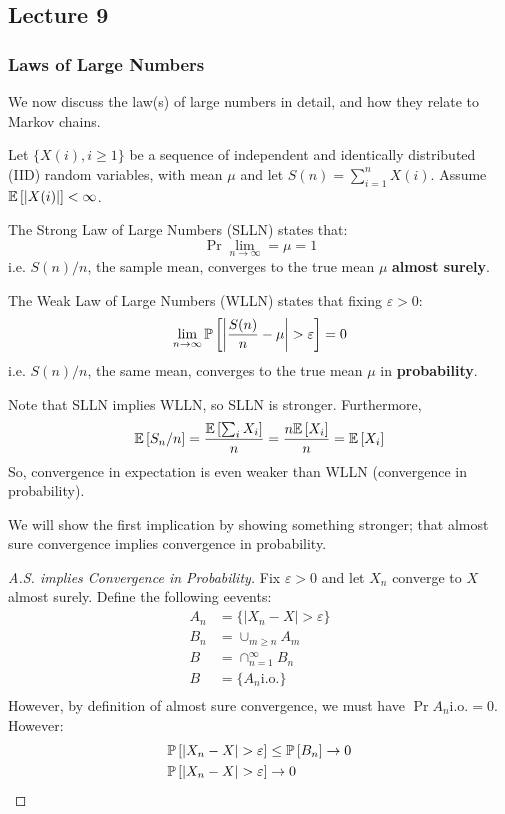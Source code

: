 \subsection{Lecture 9}

\subsubsection{Laws of Large Numbers}
We now discuss the law(s) of large numbers in detail, and how they relate to Markov chains.

\begin{theorem} 
    Let $\{X(i), i \geq 1\}$ be a sequence of independent and identically distributed (IID) random variables,
    with mean $\mu$ and let $S(n) = \sum_{i = 1}^n X(i)$. Assume $\mathbb{E}\left[ \abs{X(i)} \right] < \infty$.

    The Strong Law of Large Numbers (SLLN) states that:
    \[ \Pr{\lim_{n\to\infty} = \mu} = 1 \]
    i.e. $S(n)/n$, the sample mean, converges to the true mean $\mu$ \textbf{almost surely}.

    The Weak Law of Large Numbers (WLLN) states that fixing $\varepsilon > 0$:
    \[ \lim_{n \to \infty} \mathbb{P}\left[ \abs{\frac{S(n)}{n} - \mu} > \varepsilon \right] = 0 \]
    i.e. $S(n)/n$, the same mean, converges to the true mean $\mu$ in \textbf{probability}.
\end{theorem}

Note that SLLN implies WLLN, so SLLN is stronger. Furthermore, 
\[ \mathbb{E}\left[ S_n/n \right] = \frac{\mathbb{E}\left[ \sum_i X_i \right]}{n} = \frac{n \mathbb{E}\left[ X_i \right]}{n} = \mathbb{E}\left[ X_i \right] \]
So, convergence in expectation is even weaker than WLLN (convergence in probability).

We will show the first implication by showing something stronger; that almost sure convergence implies convergence in probability.

\begin{proof} [A.S. implies Convergence in Probability]
    Fix $\varepsilon > 0$ and let $X_n$ converge to $X$ almost surely. Define the following eevents:
    \begin{align*}
        A_n &= \{ |X_n - X| > \varepsilon \} \\
        B_n &= \cup_{m \geq n} A_m \\
        B &= \cap_{n = 1}^{\infty} B_n \\
        B &= \{ A_n \text{i.o.} \} \\
    \end{align*}
    However, by definition of almost sure convergence, we must have $\Pr{A_n \text{i.o.}} = 0$. However:
    \begin{align*}
        \mathbb{P}\left[ \abs{X_n - X} > \varepsilon \right] &\leq \mathbb{P}\left[ B_n \right] \to 0 \\
        \mathbb{P}\left[ \abs{X_n - X} > \varepsilon \right] &\to 0
    \end{align*}
\end{proof}

